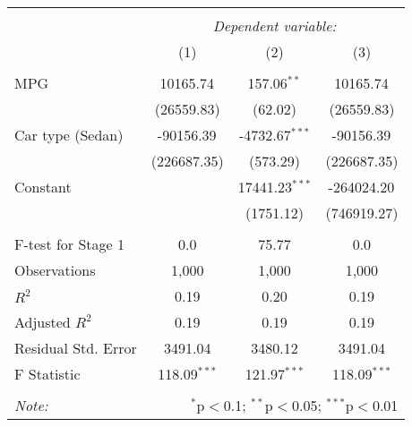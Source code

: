 

\begin{tabular}{@{\extracolsep{5pt}}lccc}
\\[-1.8ex]\hline
\hline \\[-1.8ex]
& \multicolumn{3}{c}{\textit{Dependent variable:}} \
\cr \cline{3-4}
\\[-1.8ex] & (1) & (2) & (3) \\
\hline \\[-1.8ex]
 MPG & 10165.74$^{}$ & 157.06$^{**}$ & 10165.74$^{}$ \\
  & (26559.83) & (62.02) & (26559.83) \\
 Car type (Sedan) & -90156.39$^{}$ & -4732.67$^{***}$ & -90156.39$^{}$ \\
  & (226687.35) & (573.29) & (226687.35) \\
 Constant & & 17441.23$^{***}$ & -264024.20$^{}$ \\
  & & (1751.12) & (746919.27) \\
\hline \\[-1.8ex]
 F-test for Stage 1 & 0.0 & 75.77 & 0.0 \\
 Observations & 1,000 & 1,000 & 1,000 \\
 $R^2$ & 0.19 & 0.20 & 0.19 \\
 Adjusted $R^2$ & 0.19 & 0.19 & 0.19 \\
 Residual Std. Error & 3491.04 & 3480.12 & 3491.04  \\
 F Statistic & 118.09$^{***}$  & 121.97$^{***}$  & 118.09$^{***}$  \\
\hline
\hline \\[-1.8ex]
\textit{Note:} & \multicolumn{3}{r}{$^{*}$p$<$0.1; $^{**}$p$<$0.05; $^{***}$p$<$0.01} \\
\end{tabular}